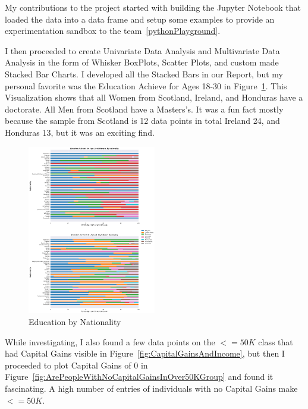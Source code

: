 \documentclass{IEEEtran}
\begin{document}
My contributions to the project started with building the Jupyter Notebook that loaded the data into a data frame and setup some examples to provide an experimentation sandbox to the team~\ref{pythonPlayground}.

I then proceeded to create Univariate Data Analysis and Multivariate Data Analysis in the form of Whisker BoxPlots, Scatter Plots, and custom made Stacked Bar Charts. I developed all the Stacked Bars in our Report, but my personal favorite was the Education Achieve for Ages 18-30 in Figure~\ref{fig:educationByNationality}. This Visualization shows that all Women from Scotland, Ireland, and Honduras have a doctorate. All Men from Scotland have a Masters's. It was a fun fact mostly because the sample from Scotland is 12 data points in total Ireland 24, and Honduras 13, but it was an exciting find. 

\begin{figure}[!t]
  \centering
  \captionsetup{justification=centering}
  \includegraphics[width=0.5\textwidth]{educationByNationality.png}%
  \caption{Education by Nationality}%
  \label{fig:educationByNationality}%
\end{figure}

While investigating, I also found a few data points on the $<=50K$ class that had Capital Gains visible in Figure~\ref{fig:CapitalGainsAndIncome}, but then I proceeded to plot Capital Gains of 0 in Figure~\ref{fig:ArePeopleWithNoCapitalGainsInOver50KGroup} and found it fascinating. A high number of entries of individuals with no Capital Gains make $<=50K$. 
\end{document}
